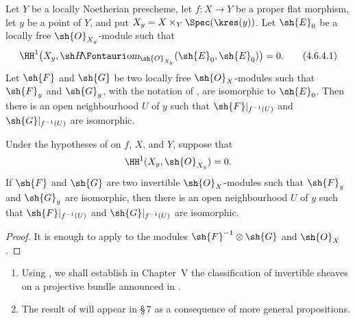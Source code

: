 \begin{corollary}[4.6.4]
\label{III.4.6.4}
Let $Y$ be a locally Noetherian prescheme, let $f:X\to Y$ be a
proper flat morphism, let $y$ be a point of $Y$, and put
$X_y=X\times_Y\Spec(\kres(y))$.  Let $\sh{E}_0$ be a locally free
$\sh{O}_{X_y}$-module such that
\[
\label{III.4.6.4.1}
  \HH^1\bigl(
    X_y,\shHom_{\sh{O}_{X_y}}(\sh{E}_0,\sh{E}_0)
  \bigr)=0.
  \tag{4.6.4.1}
\]
Let $\sh{F}$ and $\sh{G}$ be two locally free $\sh{O}_X$-modules
such that $\sh{F}_y$ and $\sh{G}_y$, with the notation of
, are isomorphic to $\sh{E}_0$.  Then there is an
open neighbourhood $U$ of $y$ such that
$\sh{F}|_{f^{-1}(U)}$ and $\sh{G}|_{f^{-1}(U)}$ are isomorphic.
\end{corollary}

\begin{corollary}[4.6.5]
\label{III.4.6.5}
Under the hypotheses of  on $f$, $X$, and $Y$,
suppose that
\[
  \HH^1(X_y,\sh{O}_{X_y})=0.
\]
If $\sh{F}$ and $\sh{G}$ are two invertible $\sh{O}_X$-modules such
that $\sh{F}_y$ and $\sh{G}_y$ are isomorphic, then there is an open
neighbourhood $U$ of $y$ such that $\sh{F}|_{f^{-1}(U)}$ and
$\sh{G}|_{f^{-1}(U)}$ are isomorphic.
\end{corollary}

\begin{proof}
It is enough to apply  to the modules
$\sh{F}^{-1}\otimes\sh{G}$ and $\sh{O}_X$.
\end{proof}

\begin{remarks}[4.6.6]
\label{III.4.6.6}
\begin{enumerate}
\item[(i)] Using , we shall establish in Chapter~V
  the classification of invertible sheaves on a projective bundle
  announced in .
\item[(ii)] The result of  will appear in \S\,7 as
  a consequence of more general propositions.
\end{enumerate}
\end{remarks}

